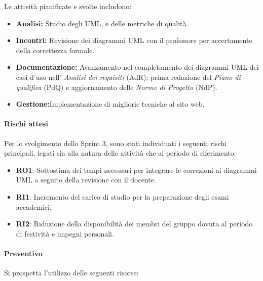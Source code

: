 \documentclass[a4paper,12pt]{article}
\begin{document}
Le attività pianificate e svolte includono:
\begin{itemize}
    \item \textbf{Analisi:} Studio degli UML, e delle metriche di qualit\`a.
    \item \textbf{Incontri:} Revisione dei diagrammi UML con il professore per accertamento della correttezza formale.
    \item \textbf{Documentazione:} Avanzamento nel completamento dei diagrammi UML dei casi d'uso nell' \textit{Analisi dei requisiti} (AdR); prima redazione del \textit{Piano di qualifica} (PdQ) e aggiornamento delle \textit{Norme di Progetto} (NdP).
    \item \textbf{Gestione:}Implementazione di migliorie tecniche al sito web.
\end{itemize}


\paragraph{Rischi attesi}
Per lo svolgimento dello Sprint 3, sono stati individuati i seguenti rischi principali, legati sia alla natura delle attività che al periodo di riferimento:

\begin{itemize}
    \item \textbf{RO1}: Sottostima dei tempi necessari per integrare le correzioni ai diagrammi UML a seguito della revisione con il docente.
    \item \textbf{RI1}: Incremento del carico di studio per la preparazione degli esami accademici.
    \item \textbf{RI2}: Riduzione della disponibilità dei membri del gruppo dovuta al periodo di festività e impegni personali.
\end{itemize}

\paragraph{Preventivo}
Si prospetta l'utilizzo delle seguenti risorse:
\end{document}
